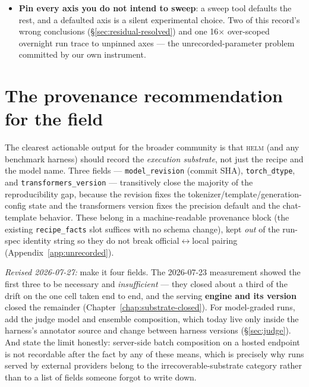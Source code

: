 \documentclass[11pt]{report}
\newcommand{\code}[1]{\texttt{#1}}
\begin{document}
\begin{itemize}[nosep]
        2026-07-27, Chapter~\ref{chap:openjudge}): reattach the original artifacts,
        run the original metric, and require the published statistics back to machine
        precision. It validates the experiment, and during development it debugs the
        reconstruction --- it caught two wrong fixtures before any judge request was
        sent.
  \item \textbf{Pin every axis you do not intend to sweep}: a sweep tool defaults
        the rest, and a defaulted axis is a silent experimental choice. Two of this
        record's wrong conclusions (\S\ref{sec:residual-resolved}) and one 16$\times$
        over-scoped overnight run trace to unpinned axes --- the unrecorded-parameter
        problem committed by our own instrument.
\end{itemize}

\section{The provenance recommendation for the field}

The clearest actionable output for the broader community is that \textsc{helm} (and
any benchmark harness) should record the \emph{execution substrate}, not just the
recipe and the model name. Three fields --- \code{model\_revision} (commit SHA),
\code{torch\_dtype}, and \code{transformers\_version} --- transitively close the
majority of the reproducibility gap, because the revision fixes the
tokenizer/template/generation-config state and the transformers version fixes the
precision default and the chat-template behavior. These belong in a machine-readable
provenance block (the existing \code{recipe\_facts} slot suffices with no schema
change), kept \emph{out} of the run-spec identity string so they do not break
official$\leftrightarrow$local pairing (Appendix~\ref{app:unrecorded}).

\emph{Revised 2026-07-27:} make it four fields. The
2026-07-23 measurement showed the first three to be necessary and
\emph{insufficient} --- they closed about a third of the drift on the one cell taken
end to end, and the serving \textbf{engine and its version} closed the remainder
(Chapter~\ref{chap:substrate-closed}). For model-graded runs, add the judge model
and ensemble composition, which today live only inside the harness's annotator
source and change between harness versions (\S\ref{sec:judge}). And state the limit
honestly: server-side batch composition on a hosted endpoint is not recordable after
the fact by any of these means, which is precisely why runs served by external
providers belong to the irrecoverable-substrate category rather than to a list of
fields someone forgot to write down.
\end{document}
